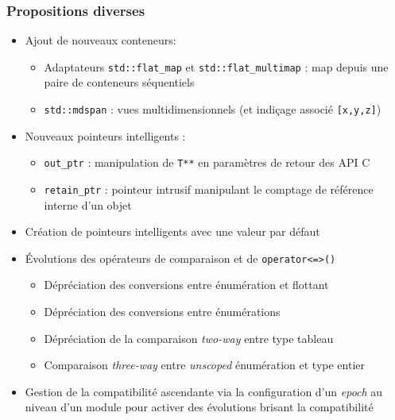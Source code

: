 \documentclass[C++.tex]{subfiles}
\begin{document}
\begin{frame}[fragile]
	\frametitle{Propositions diverses}
	\begin{itemize}
		\item Ajout de nouveaux \og conteneurs\fg{}:
		\begin{itemize}
			\item Adaptateurs \lstinline|std::flat_map| et \lstinline|std::flat_multimap| : map depuis une paire de conteneurs séquentiels
			\item \lstinline|std::mdspan| : vues multidimensionnels (et indiçage associé \lstinline|[x,y,z]|)

		\end{itemize}

		\item Nouveaux pointeurs intelligents :
		\begin{itemize}
			\item \lstinline|out_ptr| : manipulation de \lstinline|T**| en paramètres de retour des API C
			\item \lstinline|retain_ptr| : pointeur intrusif manipulant le comptage de référence interne d'un objet
		\end{itemize}
		\item Création de pointeurs intelligents avec une valeur par défaut
		\item Évolutions des opérateurs de comparaison et de \lstinline|operator<=>()|
		\begin{itemize}
			\item Dépréciation des conversions entre énumération et flottant
			\item Dépréciation des conversions entre énumérations
			\item Dépréciation de la comparaison \og \textit{two-way}\fg{} entre type tableau
			\item Comparaison \og \textit{three-way}\fg{} entre \textit{unscoped} énumération et type entier


		\end{itemize}

		\item Gestion de la compatibilité ascendante via la configuration d'un \textit{epoch} au niveau d'un module pour activer des évolutions brisant la compatibilité


	\end{itemize}
\end{frame}
\end{document}
